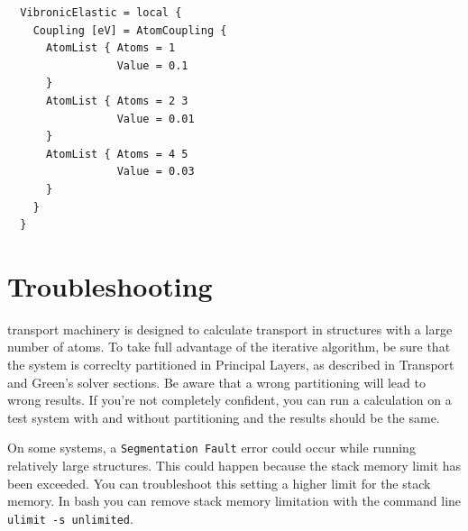   \begin{verbatim}
  VibronicElastic = local {
    Coupling [eV] = AtomCoupling {
      AtomList { Atoms = 1
                 Value = 0.1
      }
      AtomList { Atoms = 2 3
                 Value = 0.01
      }
      AtomList { Atoms = 4 5
                 Value = 0.03
      }
    }
  }
  \end{verbatim}





\section{Troubleshooting}

\dftbp{} transport machinery is designed to calculate transport in structures
with a large number of atoms. To take full advantage of the iterative algorithm,
be sure that the system is correclty partitioned in Principal Layers, as
described in Transport and Green's solver sections. Be aware that a wrong
partitioning will lead to wrong results. If you're not completely confident, you
can run a calculation on a test system with and without partitioning and the
results should be the same.


On some systems, a \verb|Segmentation Fault| error could occur while running
relatively large structures. This could happen because the stack memory limit
has been exceeded. You can troubleshoot this setting a higher limit for the
stack memory. In bash you can remove stack memory limitation with the command
line \verb|ulimit -s unlimited|.

